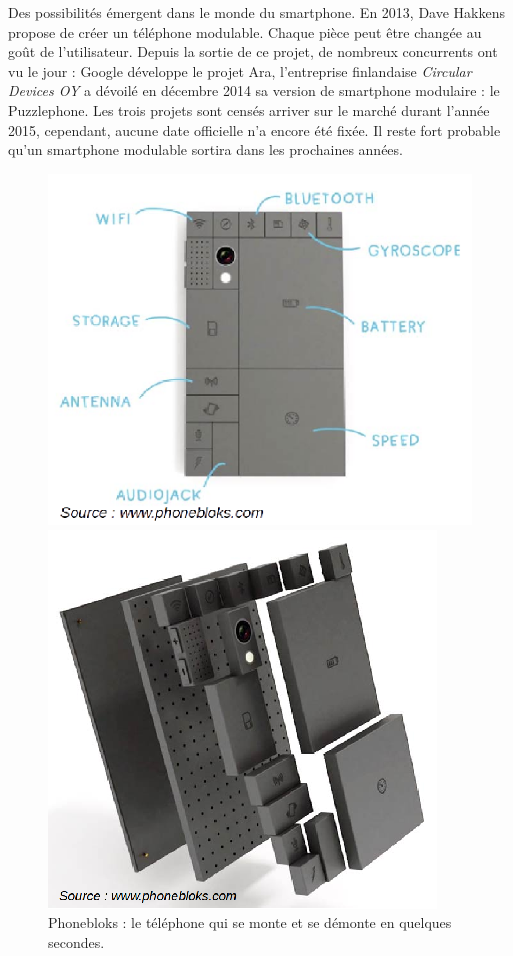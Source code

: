 Des possibilités émergent dans le monde du smartphone. En 2013, Dave Hakkens propose de créer un téléphone modulable. Chaque pièce peut être changée au goût de l'utilisateur. Depuis la sortie de ce projet, de nombreux concurrents ont vu le jour : Google développe le projet Ara,  l'entreprise finlandaise \textit{Circular Devices OY} a dévoilé en décembre 2014 sa version de smartphone modulaire : le Puzzlephone. Les trois projets sont censés arriver sur le marché durant l'année 2015, cependant, aucune date officielle n'a encore été fixée. Il reste fort probable qu'un smartphone modulable sortira dans les prochaines années. 
\begin{figure}[h]
\begin{minipage}{0.5\linewidth}
\begin{center}
\includegraphics[scale=0.6]{Rsc/phonebloks2.png} 
\end{center}
\end{minipage}
\begin{minipage}{0.5\linewidth}
\begin{center}
\includegraphics[scale=0.7]{Rsc/phonebloks1.png} 
\end{center}
\end{minipage}
\caption{\scriptsize{Phonebloks : le téléphone qui se monte et se démonte en quelques secondes.}}
\label{phonebloks}
\end{figure}

